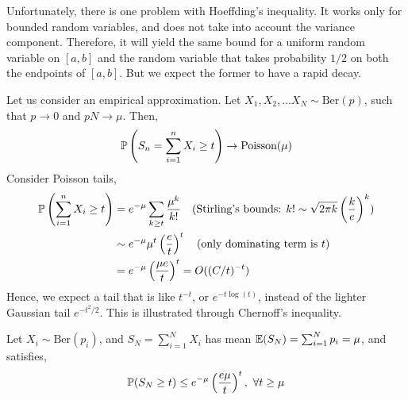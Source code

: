 \documentclass[12pt]{article}
\begin{document}
Unfortunately, there is one problem with Hoeffding's inequality. It works only for bounded random variables, and does not take into account the variance component. Therefore, it will yield the same bound for a uniform random variable on $[a, b]$ and the random variable that takes probability $1/2$ on both the endpoints of $[a, b]$. But we expect the former to have a rapid decay.

Let us consider an empirical approximation. Let $X_1, X_2, \dots X_N \sim \text{Ber}(p)$, such that $p \to 0$ and $pN \to \mu$. Then,
\begin{equation*}
    \mathbb{P}\left(S_n = \sum_{i=1}^{n} X_i \geq t\right) \rightarrow \text{Poisson}(\mu)
\end{equation*}
\noindent Consider Poisson tails,
\begin{align*}
    \mathbb{P}\left(\sum_{i=1}^{n} X_i \geq t\right)
     & = e^{-\mu} \sum_{k \geq t} \frac{\mu^k}{k!} \quad \text{(Stirling's bounds: } k! \sim \sqrt{2 \pi k}\left(\frac{k}{e}\right)^k) \\
     & \sim e^{-\mu} \mu^t \left(\frac{e}{t}\right)^t \quad \text{(only dominating term is } t)                                        \\
     & = e^{-\mu} \left(\frac{\mu e}{t}\right)^t = O((C/t)^{-t})
\end{align*}
\noindent Hence, we expect a tail that is like $t^{-t}$, or $e^{-t\log(t)}$, instead of the lighter Gaussian tail $e^{-t^2/2}$. This is illustrated through Chernoff's inequality.

\begin{theorembox}
    Let $X_i \sim \text{Ber}(p_i)$, and $S_N = \sum_{i=1}^N X_i$ has mean $\mathbb{E}(S_N) = \sum_{i=1}^N p_i = \mu$, and satisfies,
    \begin{equation*}
        \mathbb{P}(S_N \geq t) \leq e^{-\mu}\left( \dfrac{e\mu}{t} \right)^t, \ \forall t \geq \mu
    \end{equation*}
\end{theorembox}
\end{document}
